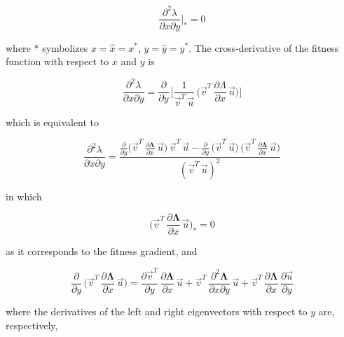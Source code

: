 \begin{equation}
    \frac{\partial^2 \lambda}{\partial x \partial y}\bigg|_* = 0
\end{equation}

where $*$ symbolizes $x=\hat x=x^*$, $y=\hat y=y^*$. The cross-derivative of the fitness function with respect to $x$ and $y$ is

\begin{equation}
    \frac{\partial^2 \lambda}{\partial x \partial y} = \frac{\partial}{\partial y}\,\Bigg[\frac{1}{\overrightarrow{v}^T\,\overrightarrow{u}}\,\bigg( \overrightarrow{v}^T\,\frac{\partial \Lambda}{\partial x}\,\overrightarrow{u} \bigg)\Bigg]
\end{equation}

which is equivalent to

\begin{equation}
    \frac{\partial^2 \lambda}{\partial x \partial y} = \frac{\frac{\partial}{\partial y}\Big(\overrightarrow{v}^T\,\frac{\partial \pmb \Lambda}{\partial x}\,\overrightarrow{u}\Big)\,\overrightarrow{v}^T\,\overrightarrow{u}-\frac{\partial}{\partial y}\,\Big(\overrightarrow{v}^T\,\overrightarrow{u}\Big)\,\Big(\overrightarrow{v}^T\,\frac{\partial \pmb \Lambda}{\partial x}\,\overrightarrow{u}\Big)}{(\overrightarrow{v}^T\,\overrightarrow{u})^2}
\end{equation}

in which

\begin{equation}
    \bigg(\overrightarrow{v}^T\,\frac{\partial \pmb \Lambda}{\partial x}\,\overrightarrow{u}\bigg)_* = 0
\end{equation}

as it corresponds to the fitness gradient, and

\begin{equation}
    \frac{\partial}{\partial y}\,\bigg(\overrightarrow{v}^T\,\frac{\partial \pmb \Lambda}{\partial x}\,\overrightarrow{u}\bigg) = \frac{\partial \overrightarrow{v}^T}{\partial y}\,\frac{\partial \pmb \Lambda}{\partial x}\,\overrightarrow{u}+\overrightarrow{v}^T\,\frac{\partial^2 \pmb \Lambda}{\partial x \partial y}\,\overrightarrow{u}+\overrightarrow{v}^T\,\frac{\partial \pmb \Lambda}{\partial x}\,\frac{\partial \overrightarrow{u}}{\partial y}   
    \label{eq:deriv_lambda_x_y}
\end{equation}

where the derivatives of the left and right eigenvectors with respect to $y$ are, respectively,

